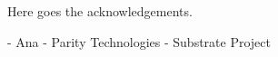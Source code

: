 
\begin{acknowledgements}      %

Here goes the acknowledgements.

- Ana
- Parity Technologies
- Substrate Project

\end{acknowledgements}

